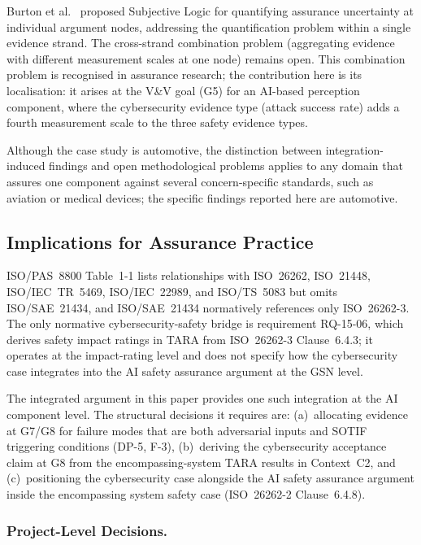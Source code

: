 \documentclass[runningheads]{llncs}
\newcommand{\new}[1]{#1}
\newcommand{\new}[1]{\textcolor{blue}{#1}}
\newcommand{\crev}[1]{\textcolor{blue!75!black}{#1}}
\newcommand{\crev}[1]{#1}
\begin{document}
	Burton et al.~\cite{Burton2024} proposed Subjective Logic for quantifying assurance uncertainty at individual argument nodes, addressing the quantification problem within a single evidence strand. The cross-strand combination problem (aggregating evidence with different measurement scales at one node) remains open. \crev{This combination problem is recognised in assurance research; the contribution here is its localisation: it arises at the V\&V goal (G5) for an AI-based perception component, where the cybersecurity evidence type (attack success rate) adds a fourth measurement scale to the three safety evidence types.}
	
	\crev{Although the case study is automotive, the distinction between integration-induced findings and open methodological problems applies to any domain that assures one component against several concern-specific standards, such as aviation or medical devices; the specific findings reported here are automotive.}
	
	\subsection{Implications for Assurance Practice}
	
	{\sloppy \new{ISO/PAS~8800 Table~1-1 lists relationships with ISO~26262, ISO~21448, ISO/IEC~TR~5469, ISO/IEC~22989, and ISO/TS~5083 but omits ISO/SAE~21434, and ISO/SAE~21434 normatively references only ISO~26262-3. The only normative cybersecurity-safety bridge is requirement RQ-15-06, which derives safety impact ratings in TARA from ISO~26262-3 Clause~6.4.3; it operates at the impact-rating level and does not specify how the cybersecurity case integrates into the AI safety assurance argument at the GSN level.}\par}
	
	\new{The integrated argument in this paper provides one such integration at the AI component level. The structural decisions it requires are: (a)~allocating evidence at G7/G8 for failure modes that are both adversarial inputs and SOTIF triggering conditions (DP-5, F-3), (b)~deriving the cybersecurity acceptance claim at G8 from the encompassing-system TARA results in Context~C2, and (c)~positioning the cybersecurity case alongside the AI safety assurance argument inside the encompassing system safety case (ISO~26262-2 Clause~6.4.8).}
	
	\new{\subsubsection{Project-Level Decisions.}}
	
\end{document}
